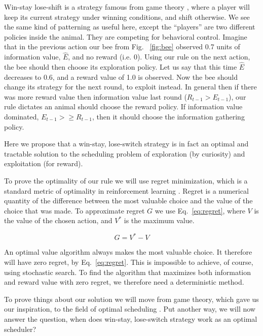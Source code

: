 Win-stay lose-shift is a strategy famous from game theory \citep{Nowak1993}, where a player will keep its current strategy under winning conditions, and shift otherwise. We see the same kind of patterning as useful here, except the ``players'' are two different policies inside the animal. They are competing for behavioral control. Imagine that in the previous action our bee from Fig. ~\ref{fig:bee} observed 0.7 units of information value, $\hat E$, and no reward (i.e. 0). Using our rule on the next action, the bee should then choose its exploration policy. Let us say that this time $\hat E$ decreases to 0.6, and a reward value of 1.0 is observed. Now the bee should change its strategy for the next round, to exploit instead. In general then if there was more reward value then information value last round ($R_{t-1} > E_{t-1}$), our rule dictates an animal should choose the reward policy. If information value dominated, $E_{t-1} > \ge R_{t-1}$, then it should choose the information gathering policy.

Here we propose that a win-stay, lose-switch strategy is in fact an optimal and tractable solution to the scheduling problem of exploration (by curiosity) and exploitation (for reward).

To prove the optimality of our rule we will use regret minimization, which is a standard metric of optimality in reinforcement learning \citep{Sutton2018}. Regret is a numerical quantity of the difference between the most valuable choice and the value of the choice that was made. To approximate regret $G$ we use Eq.~\ref{eq:regret}, where $V$ is the value of the chosen action, and $V^*$ is the maximum value. 

\begin{equation}
\label{eq:regret}
	G = V^* - V
\end{equation}

An optimal value algorithm always makes the most valuable choice. It therefore will have zero regret, by Eq.~\ref{eq:regret}. This is impossible to achieve, of course, using stochastic search. To find the algorithm that maximizes both information and reward value with zero regret, we therefore need a deterministic method. 

To prove things about our solution we will move from game theory, which gave us our inspiration, to the field of optimal scheduling \citep{Bellmann1954,Roughgarden2019}. Put another way, we will now answer the question, when does win-stay, lose-switch strategy work as an optimal scheduler? 

